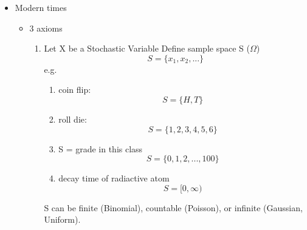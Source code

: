 \begin{itemize}
      \item Modern times
            \begin{itemize}
                  \item 3 axioms
                        \begin{enumerate}
                              \item Let X be a Stochastic Variable
                                    Define sample space S ($\Omega$)
                                    \[ S = \{x_1, x_2, ...\}\]
                                    e.g.
                                    \begin{enumerate}
                                          \item coin flip:
                                                \[S = \{H, T\}\]
                                          \item roll die:
                                                \[S = \{1, 2, 3, 4, 5, 6\}\]
                                          \item S = grade in this class
                                                \[ S = \{0, 1, 2, ..., 100\}\]
                                          \item decay time of radiactive atom
                                                \[ S = [0, \infty)\]
                                    \end{enumerate}
                                    S can be finite (Binomial), countable (Poisson), or infinite (Gaussian, Uniform).


                        \end{enumerate}

            \end{itemize}
\end{itemize}


